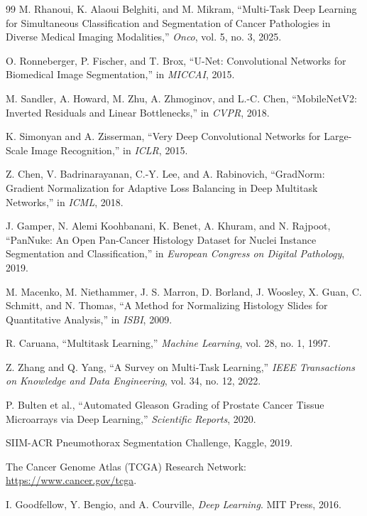 \documentclass[conference,a4paper]{IEEEtran}
\begin{document}
\begin{thebibliography}{99}
M. Rhanoui, K. Alaoui Belghiti, and M. Mikram, ``Multi-Task Deep Learning for Simultaneous Classification and Segmentation of Cancer Pathologies in Diverse Medical Imaging Modalities,'' \emph{Onco}, vol. 5, no. 3, 2025.

O. Ronneberger, P. Fischer, and T. Brox, ``U-Net: Convolutional Networks for Biomedical Image Segmentation,'' in \emph{MICCAI}, 2015.

M. Sandler, A. Howard, M. Zhu, A. Zhmoginov, and L.-C. Chen, ``MobileNetV2: Inverted Residuals and Linear Bottlenecks,'' in \emph{CVPR}, 2018.

K. Simonyan and A. Zisserman, ``Very Deep Convolutional Networks for Large-Scale Image Recognition,'' in \emph{ICLR}, 2015.

Z. Chen, V. Badrinarayanan, C.-Y. Lee, and A. Rabinovich, ``GradNorm: Gradient Normalization for Adaptive Loss Balancing in Deep Multitask Networks,'' in \emph{ICML}, 2018.

J. Gamper, N. Alemi Koohbanani, K. Benet, A. Khuram, and N. Rajpoot, ``PanNuke: An Open Pan-Cancer Histology Dataset for Nuclei Instance Segmentation and Classification,'' in \emph{European Congress on Digital Pathology}, 2019.

M. Macenko, M. Niethammer, J. S. Marron, D. Borland, J. Woosley, X. Guan, C. Schmitt, and N. Thomas, ``A Method for Normalizing Histology Slides for Quantitative Analysis,'' in \emph{ISBI}, 2009.

R. Caruana, ``Multitask Learning,'' \emph{Machine Learning}, vol. 28, no. 1, 1997.

Z. Zhang and Q. Yang, ``A Survey on Multi-Task Learning,'' \emph{IEEE Transactions on Knowledge and Data Engineering}, vol. 34, no. 12, 2022.

P. Bulten et al., ``Automated Gleason Grading of Prostate Cancer Tissue Microarrays via Deep Learning,'' \emph{Scientific Reports}, 2020.

SIIM-ACR Pneumothorax Segmentation Challenge, Kaggle, 2019.

The Cancer Genome Atlas (TCGA) Research Network: \url{https://www.cancer.gov/tcga}.

I. Goodfellow, Y. Bengio, and A. Courville, \emph{Deep Learning}. MIT Press, 2016.


\end{thebibliography}
\end{document}
